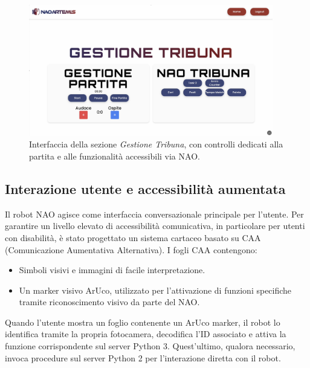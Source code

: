 \documentclass{optica-article}
\begin{document}
\begin{figure}[h!]
    \centering
    \includegraphics[width=0.95\textwidth]{figures/gestione_tribuna.png}
    \caption{Interfaccia della sezione \textit{Gestione Tribuna}, con controlli dedicati alla partita e alle funzionalità accessibili via NAO.}
    \label{fig:gestione_tribuna}
\end{figure}

\subsection{Interazione utente e accessibilit\`a aumentata}
Il robot NAO agisce come interfaccia conversazionale principale per l'utente. Per garantire un livello elevato di accessibilit\`a comunicativa, in particolare per utenti con disabilit\`a, \`e stato progettato un sistema cartaceo basato su CAA (Comunicazione Aumentativa Alternativa). I fogli CAA contengono:
\begin{itemize}
    \item Simboli visivi e immagini di facile interpretazione.
    \item Un marker visivo ArUco, utilizzato per l'attivazione di funzioni specifiche tramite riconoscimento visivo da parte del NAO.
\end{itemize}
Quando l'utente mostra un foglio contenente un ArUco marker, il robot lo identifica tramite la propria fotocamera, decodifica l'ID associato e attiva la funzione corrispondente sul server Python 3. Quest'ultimo, qualora necessario, invoca procedure sul server Python 2 per l'interazione diretta con il robot.
\end{document}
